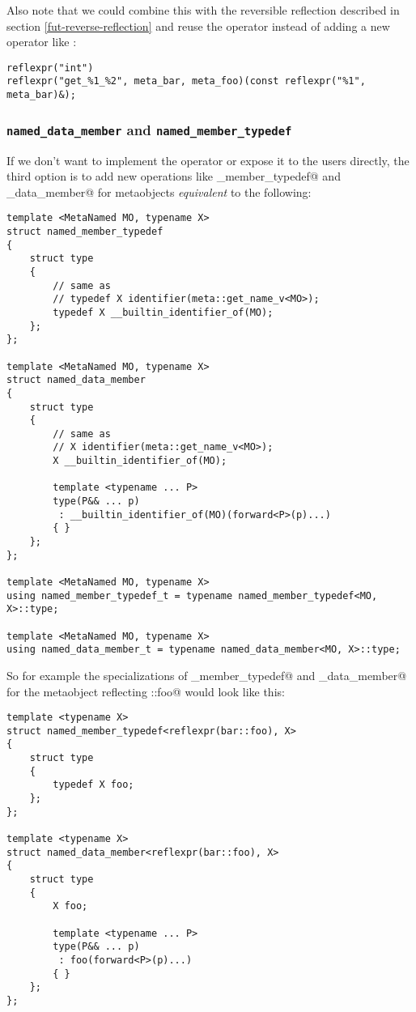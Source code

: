Also note that we could combine this with the reversible reflection described
in section \ref{fut-reverse-reflection} and reuse the \verb@reflexpr@ operator
instead of adding a new operator like \verb@identifier@:

\begin{verbatim}
reflexpr("int")
reflexpr("get_%1_%2", meta_bar, meta_foo)(const reflexpr("%1", meta_bar)&);
\end{verbatim}

\subsubsection{\texttt{named\_data\_member} and \texttt{named\_member\_typedef}}
\label{fut-named-member-X}

If we don't want to implement the operator \verb@identifier@ or expose it
to the users directly, the third option is to add new operations like
\verb@named_member_typedef@  and \verb@named_data_member@ for 
metaobjects {\em equivalent} to the following:

\begin{verbatim}
template <MetaNamed MO, typename X>
struct named_member_typedef
{
	struct type
	{
		// same as
		// typedef X identifier(meta::get_name_v<MO>);
		typedef X __builtin_identifier_of(MO);
	};
};

template <MetaNamed MO, typename X>
struct named_data_member
{
	struct type
	{
		// same as
		// X identifier(meta::get_name_v<MO>);
		X __builtin_identifier_of(MO);

		template <typename ... P>
		type(P&& ... p)
		 : __builtin_identifier_of(MO)(forward<P>(p)...) 
		{ }
	};
};

template <MetaNamed MO, typename X>
using named_member_typedef_t = typename named_member_typedef<MO, X>::type;

template <MetaNamed MO, typename X>
using named_data_member_t = typename named_data_member<MO, X>::type;
\end{verbatim}

So for example the specializations of \verb@named_member_typedef@ and
\verb@named_data_member@ for the metaobject reflecting \verb@bar::foo@ would
look like this:

\begin{verbatim}
template <typename X>
struct named_member_typedef<reflexpr(bar::foo), X>
{
	struct type
	{
		typedef X foo;
	};
};

template <typename X>
struct named_data_member<reflexpr(bar::foo), X>
{
	struct type
	{
		X foo;

		template <typename ... P>
		type(P&& ... p)
		 : foo(forward<P>(p)...) 
		{ }
	};
};
\end{verbatim}

